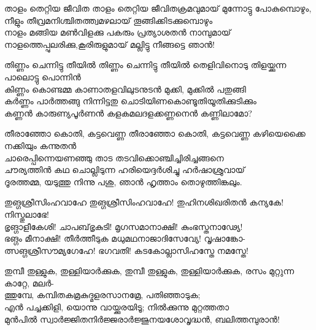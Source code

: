 \begin{enumerate}



\begin{slokam}{\VSv}{\HM}{താളം തെറ്റിയ ജീവിത}
താളം തെറ്റിയ ജീവിതക്രമവുമായ് മുന്നോട്ടു പോകുമ്പൊഴും,\\
നീളും തീവ്രമനിശ്ചിതത്ത്വമഴലായ് തൂങ്ങിക്കിടക്കുമ്പൊഴും\\
നാളം മങ്ങിയ മൺവിളക്കു പകരും പ്രത്യാശതൻ നാമ്പുമായ്\\
നാളത്തെപ്പുലരിക്കു,കൂരിരുളുമായ് മല്ലിട്ടു നീങ്ങട്ടെ ഞാൻ!
\end{slokam}


\begin{slokam}{\VSr}{\KAM}{തിണ്ണം ചെന്നിട്ടു തീയിൽ}
തിണ്ണം ചെന്നിട്ടു തീയിൽ തെളിവിനൊടു തിളയ്ക്കുന്ന പാലൊട്ടു പൊന്നിൻ\\
കിണ്ണം കൊണ്ടമ്മ കാണാതളവിലുടനുടൻ മുക്കി, മുക്കിൽ പതുങ്ങി\\
കർണ്ണം പാർത്തങ്ങു നിന്നിട്ടതു ചൊടിയിണകൊണ്ടൂതിയൂതിക്കുടിക്കും\\
കണ്ണൻ കാരുണ്യപൂർണൻ കളകമലദളക്കണ്ണനെൻ കണ്ണിലാമോ?
\end{slokam}



\begin{slokam}{\VSv}{\PCM}{തീരാഞ്ഞോ കൊതി, കട്ടവെണ്ണ}
തീരാഞ്ഞോ കൊതി, കട്ടവെണ്ണ കഴിയെക്കൈ നക്കിയും കന്നുതൻ\\
ചാരെപ്പിന്നെയണഞ്ഞു താട തടവിക്കൊഞ്ചിച്ചിരിച്ചങ്ങനെ\\
ചൗര്യത്തിൻ കഥ ചൊല്ലിടുന്ന ഹരിയെദ്ദർശിച്ചു ഹർഷാശ്രുവായ്‌\\
ദൂരത്തമ്മ, യടുത്തു നിന്നു പശു, ഞാൻ ഹൃത്താം തൊഴുത്തിങ്കലും.

\end{slokam}


\begin{slokam}{\VSr}{\KochT}{തുങ്ഗശ്രീസിംഹവാഹേ}
തുങ്ഗശ്രീസിംഹവാഹേ! തുഹിനശിഖരിതൻ കന്യകേ! നിസ്തുലാഭേ!\\
ഭൃങ്ഗാളീകേശി! ചാപബ്‌ഭൃകുടി! മൃഗസമാനാക്ഷി! കുംഭസ്തനാഢ്യേ!\\
ഭങ്ഗം മീനാക്ഷി! തീർത്തീടുക മധുമഥനാജാദിസേവ്യേ! വൃഷാങ്കോ-\\
ത്സങ്ഗശ്രീസൗമ്യഗേഹേ! ഭഗവതി! കടകോല്ലാസിഹസ്തേ നമസ്തേ!

\end{slokam}


\begin{slokam}{\VSv}{\KND}{തുമ്പീ തുള്ളുക, തുള്ളിയാർക്കുക,}
തുമ്പീ തുള്ളുക, തുള്ളിയാർക്കുക, രസം മുറ്റുന്ന കാറ്റേ, മലർ-\\
ത്തുമ്പേ, കമ്പിതകമ്രകുദ്മളരസാനമ്രേ, പതിഞ്ഞാടുക;\\
എൻ പച്ചക്കിളി, യൊന്നു വായ്ക്കുരയിടൂ; നിൽക്കുന്നു മുറ്റത്തതാ\\
മുൻപിൽ സ്വാർജ്ജിതനിർജ്ജരാർജ്ജുനയശോവൃദ്ധൻ, ബലിത്തമ്പുരാൻ!


\end{slokam}
\end{enumerate}
